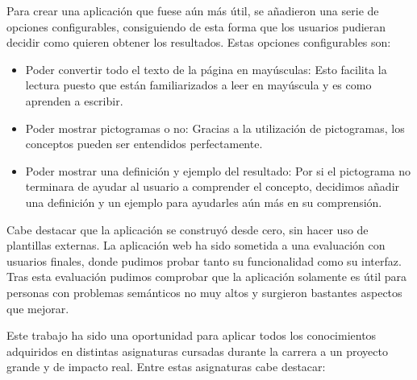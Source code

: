 Para crear una aplicación que fuese aún más útil, se añadieron una serie de opciones configurables, consiguiendo de esta forma que los usuarios pudieran decidir como quieren obtener los resultados. Estas opciones configurables son: 
\begin{itemize}
	\item Poder convertir todo el texto de la página en mayúsculas: Esto facilita la lectura puesto que están familiarizados a leer en mayúscula y es como aprenden a escribir.
    \item Poder mostrar pictogramas o no: Gracias a la utilización de pictogramas, los conceptos pueden ser entendidos perfectamente.
    \item Poder mostrar una definición y ejemplo del resultado: Por si el pictograma no terminara de ayudar al usuario a comprender el concepto, decidimos añadir una definición y un ejemplo para ayudarles aún más en su comprensión.
\end{itemize}

	Cabe destacar que la aplicación se construyó desde cero, sin hacer uso de plantillas externas.
	La aplicación web ha sido sometida a una evaluación con usuarios finales, donde pudimos probar tanto su funcionalidad como su interfaz. Tras esta evaluación pudimos comprobar que la aplicación solamente es útil para personas con problemas semánticos no muy altos y surgieron bastantes aspectos que mejorar.
	
	 Este trabajo ha sido una oportunidad para aplicar todos los conocimientos adquiridos en distintas asignaturas cursadas durante la carrera a un proyecto grande y de impacto real. Entre estas asignaturas cabe destacar:
 	
